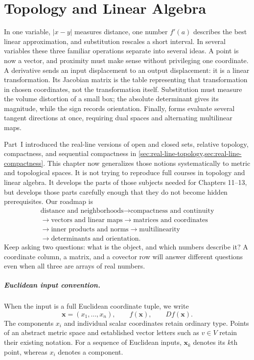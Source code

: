 \chapter{Topology and Linear Algebra}
\label{ch:topology-linear-algebra}

In one variable, $|x-y|$ measures distance, one number $f'(a)$ describes
the best linear approximation, and substitution rescales a short interval.
In several variables these three familiar operations separate into several
ideas. A point is now a vector, and proximity must make sense without
privileging one coordinate. A derivative sends an input displacement to an
output displacement: it is a linear transformation. Its Jacobian matrix is
the table representing that transformation in chosen coordinates, not the
transformation itself. Substitution must measure the volume distortion of a
small box; the absolute determinant gives its magnitude, while the sign
records orientation. Finally, forms evaluate several tangent directions at
once, requiring dual spaces and alternating multilinear maps.

Part~I introduced the real-line versions of open and closed sets, relative
topology, compactness, and sequential compactness in
\cref{sec:real-line-topology,sec:real-line-compactness}. This chapter now
generalizes those notions systematically to metric and topological spaces.
It is not trying to reproduce full courses in topology and linear algebra.
It develops the parts of those subjects needed for Chapters 11--13,
but develops those parts carefully enough that they do not become hidden
prerequisites. Our roadmap is
\[
\begin{gathered}
\text{distance and neighborhoods}\longrightarrow\text{compactness and continuity}\\
\longrightarrow\text{vectors and linear maps}\longrightarrow\text{matrices and coordinates}\\
\longrightarrow\text{inner products and norms}\longrightarrow\text{multilinearity}\\
\longrightarrow\text{determinants and orientation}.
\end{gathered}
\]
Keep asking two questions: what is the object, and which numbers describe
it? A coordinate column, a matrix, and a covector row will answer different
questions even when all three are arrays of real numbers.

\paragraph{Euclidean input convention.}
When the input is a full Euclidean coordinate tuple, we write
\[
\mathbf{x}=(x_1,\ldots,x_n),\qquad f(\mathbf{x}),\qquad Df(\mathbf{x}).
\]
The components $x_i$ and individual scalar coordinates retain ordinary type.
Points of an abstract metric space and established vector letters such as
$v\in V$ retain their existing notation. For a sequence of Euclidean inputs,
$\mathbf{x}_k$ denotes its $k$th point, whereas $x_i$ denotes a component.

